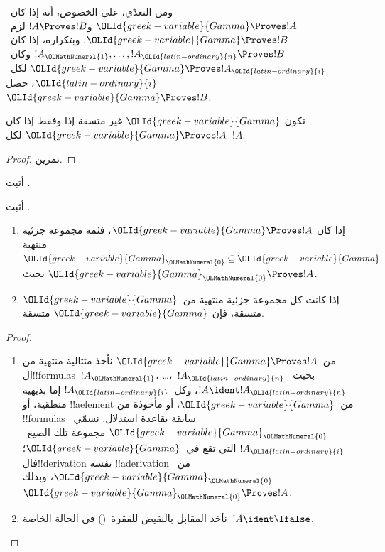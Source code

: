 \documentclass[../../../include/open-logic-section]{subfiles}
\begin{document}
ومن التعدّي، على الخصوص، أنه إذا كان~$\OLId{greek-variable}{Gamma} \Proves !A$ و$!A
\Proves !B$ لزم~$\OLId{greek-variable}{Gamma} \Proves !B$. وبتكراره، إذا كان~$!A_\OLMathNumeral{1},
\dots, !A_\OLId{latin-ordinary}{n} \Proves !B$ وكان~$\OLId{greek-variable}{Gamma} \Proves !A_\OLId{latin-ordinary}{i}$ لكل~$\OLId{latin-ordinary}{i}$،
حصل~$\OLId{greek-variable}{Gamma} \Proves !B$.


\begin{prop}
تكون $\OLId{greek-variable}{Gamma}$ غير متسقة إذا وفقط إذا كان $\OLId{greek-variable}{Gamma} \Proves !A$ لكل~$!A$.
\end{prop}

\begin{proof}
تمرين.
\end{proof}

\begin{prob}
أثبت .
\end{prob}
\tagendprob

\begin{prob}
أثبت .
\end{prob}
\tagendprob

\begin{prop}[التراص]
  \begin{enumerate}
  \item إذا كان $\OLId{greek-variable}{Gamma} \Proves !A$، فثمة مجموعة جزئية منتهية $\OLId{greek-variable}{Gamma}_\OLMathNumeral{0}
    \subseteq \OLId{greek-variable}{Gamma}$ بحيث $\OLId{greek-variable}{Gamma}_\OLMathNumeral{0} \Proves !A$.
  \item إذا كانت كل مجموعة جزئية منتهية من~$\OLId{greek-variable}{Gamma}$ متسقة، فإن
    $\OLId{greek-variable}{Gamma}$ متسقة.
  \end{enumerate}
\end{prop}

\begin{proof}
  \begin{enumerate}
    \item من~$\OLId{greek-variable}{Gamma} \Proves !A$ نأخذ متتالية منتهية من
      ال!!{formula}s~$!A_\OLMathNumeral{1}$، \dots،~$!A_\OLId{latin-ordinary}{n}$ بحيث~$!A \ident !A_\OLId{latin-ordinary}{n}$،
      وكل~$!A_\OLId{latin-ordinary}{i}$ إما بديهية منطقية، أو !!a{element} من~$\OLId{greek-variable}{Gamma}$،
      أو مأخوذة من !!{formula}s سابقة بقاعدة استدلال.
      نسمّي~$\OLId{greek-variable}{Gamma}_\OLMathNumeral{0}$ مجموعة تلك الصيغ~$!A_\OLId{latin-ordinary}{i}$ التي تقع
      في~$\OLId{greek-variable}{Gamma}$؛ فال!!{derivation} نفسه !!a{derivation}
      من~$\OLId{greek-variable}{Gamma}_\OLMathNumeral{0}$، وبذلك~$\OLId{greek-variable}{Gamma}_\OLMathNumeral{0} \Proves !A$.
    \item نأخذ المقابل بالنقيض للفقرة~() في الحالة الخاصة~$!A
      \ident \lfalse$.

\end{enumerate}
\end{proof}
\end{document}
